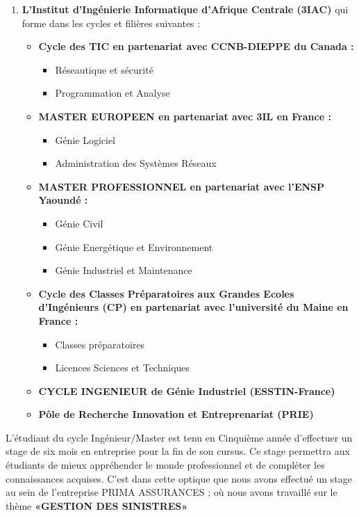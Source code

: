 \begin{enumerate}
	
	\item \textbf{L’Institut d’Ingénierie Informatique d’Afrique Centrale (3IAC)} qui forme dans les cycles et filières suivantes :
	
	\begin{itemize}
		\item \textbf{Cycle des TIC en partenariat avec CCNB-DIEPPE du Canada :}
		\begin{itemize}
			\item Réseautique et sécurité
			\item Programmation et Analyse
		\end{itemize}
		\item \textbf{MASTER EUROPEEN en partenariat avec 3IL en France :}
		\begin{itemize}
			\item Génie Logiciel
			\item Administration des Systèmes Réseaux
		\end{itemize}
		\item \textbf{MASTER PROFESSIONNEL en partenariat avec l’ENSP Yaoundé :}
		\begin{itemize}
			\item Génie Civil
			\item Génie Energétique et Environnement
			\item Génie Industriel et Maintenance
		\end{itemize}
		\item \textbf{Cycle des Classes Préparatoires aux Grandes Ecoles d’Ingénieurs (CP) en partenariat avec l’université du Maine en France :}
		\begin{itemize}
			\item Classes préparatoires
			\item Licences Sciences et Techniques
		\end{itemize}
		\item \textbf{CYCLE INGENIEUR de Génie Industriel (ESSTIN-France)}
		\item \textbf{Pôle de Recherche Innovation et Entreprenariat (PRIE)}
	\end{itemize}

\end{enumerate}

L’étudiant du cycle Ingénieur/Master est tenu en Cinquième année d’effectuer un stage de six mois en entreprise pour la fin de son cursus. Ce stage permettra aux étudiants de mieux appréhender le monde professionnel et de compléter les connaissances acquises. C’est dans cette optique que nous avons effectué un stage au sein de l’entreprise PRIMA ASSURANCES ; où nous avons travaillé sur le thème \textbf{«GESTION DES SINISTRES»}
